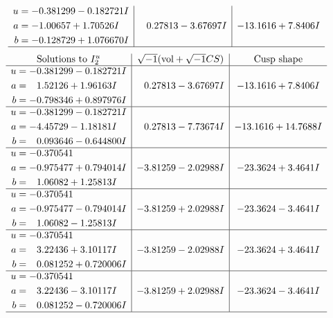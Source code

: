 \documentclass[1p]{elsarticle_modified}
\theoremstyle{definition}
\newcommand{\I}{\sqrt{-1}}
\begin{document}
$$\begin{array}{c|c|c}
\begin{aligned}
u &= -0.381299 - 0.182721 I \\
a &= -1.00657 + 1.70526 I \\
b &= -0.128729 + 1.076670 I\end{aligned}
 & \phantom{-}0.27813 - 3.67697 I & -13.1616 + 7.8406 I\\
 \hline 
 \end{array}$$\newpage$$\begin{array}{c|c|c}  
\text{Solutions to }I^u_{2}& \I (\text{vol} + \sqrt{-1}CS) & \text{Cusp shape}\\
 \hline 
\begin{aligned}
u &= -0.381299 - 0.182721 I \\
a &= \phantom{-}1.52126 + 1.96163 I \\
b &= -0.798346 + 0.897976 I\end{aligned}
 & \phantom{-}0.27813 - 3.67697 I & -13.1616 + 7.8406 I \\ \hline\begin{aligned}
u &= -0.381299 - 0.182721 I \\
a &= -4.45729 - 1.18181 I \\
b &= \phantom{-}0.093646 - 0.644800 I\end{aligned}
 & \phantom{-}0.27813 - 7.73674 I & -13.1616 + 14.7688 I \\ \hline\begin{aligned}
u &= -0.370541\phantom{ +0.000000I} \\
a &= -0.975477 + 0.794014 I \\
b &= \phantom{-}1.06082 + 1.25813 I\end{aligned}
 & -3.81259 - 2.02988 I & -23.3624 + 3.4641 I \\ \hline\begin{aligned}
u &= -0.370541\phantom{ +0.000000I} \\
a &= -0.975477 - 0.794014 I \\
b &= \phantom{-}1.06082 - 1.25813 I\end{aligned}
 & -3.81259 + 2.02988 I & -23.3624 - 3.4641 I \\ \hline\begin{aligned}
u &= -0.370541\phantom{ +0.000000I} \\
a &= \phantom{-}3.22436 + 3.10117 I \\
b &= \phantom{-}0.081252 + 0.720006 I\end{aligned}
 & -3.81259 - 2.02988 I & -23.3624 + 3.4641 I \\ \hline\begin{aligned}
u &= -0.370541\phantom{ +0.000000I} \\
a &= \phantom{-}3.22436 - 3.10117 I \\
b &= \phantom{-}0.081252 - 0.720006 I\end{aligned}
 & -3.81259 + 2.02988 I & -23.3624 - 3.4641 I\\
 \hline 
 \end{array}$$\newpage\newpage\renewcommand{\arraystretch}{1}
\end{document}
